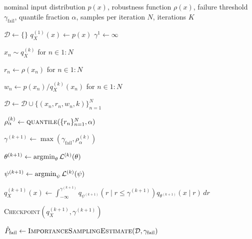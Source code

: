 \documentclass[twoside,11pt]{article}
\begin{document}
\begin{algorithm}[ht!]
\caption{\algfullname{}}
\label{alg:method}
%
%
\renewcommand{\algorithmicdo}{}
\begin{algorithmic}[1]

\Require nominal input distribution $p(x)$, robustness function $\rho(x)$,
failure threshold $\gamma_{\mathrm{fail}}$, quantile fraction $\alpha$,
samples per iteration $N$, iterations $K$


    \State $\mathcal{D} \gets \{\}$ 
    \State $q_X^{(1)}(x) \gets p(x)$ 
    \State $\gamma^{1} \gets \infty$


        \State $x_n \sim q_X^{(k)}$ for $n \in 1:N$

        \State $r_n \gets \rho(x_n)$ for $n \in 1:N$

        \State $w_n
        \gets
        p(x_n)/q_X^{(k)}(x_n)$ for $n \in 1:N$

        \State $\mathcal{D}
        \gets
        \mathcal{D}
        \cup
        \{(x_n,r_n,w_n,k)\}_{n=1}^{N}$

        \State $\rho_{\alpha}^{(k)}
        \gets
        \textsc{quantile}(\{r_n\}_{n=1}^{N},\alpha)$

        \State $\gamma^{(k+1)}
        \gets
        \max(\gamma_{\mathrm{fail}},\rho_{\alpha}^{(k)})$

        \State $\theta^{(k+1)}
        \gets
        \operatorname*{\arg\!\min}_{\theta}
        \mathcal{L}^{(k)}(\theta)$

        \State $\psi^{(k+1)}
        \gets
        \operatorname*{\arg\!\min}_{\psi}
        \mathcal{L}^{(k)}(\psi)$

        \State $q_X^{(k+1)}(x)
        \gets
        \int_{-\infty}^{\gamma^{(k+1)}}
        q_{\psi^{(k+1)}}(r \mid r\leq\gamma^{(k+1)})
        q_{\theta^{(k+1)}}(x\mid r)\,dr$

        \State \textsc{Checkpoint}$(q_X^{(k+1)},\gamma^{(k+1)})$

    \EndFor

    \State \Return $\hat{P}_{\mathrm{fail}}
    \gets
    \textsc{ImportanceSamplingEstimate}
    (\mathcal{D},\gamma_{\mathrm{fail}})$

\EndFunction
\end{algorithmic}
\end{algorithm}
\end{document}
